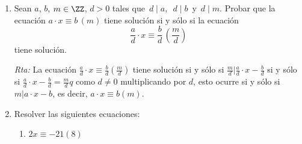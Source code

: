 \documentclass[12pt,spanish,makeidx]{amsbook}
\newcommand{\rta}{\noindent\textit{Rta: }}
\begin{document}
\begin{enumerate}
\begin{enumerate}
	\rta 	No tiene soluciones pues $0^2=0, 1^2=1, 2^2\equiv 1 (3)$.
		
		\item $ x^2  \equiv 0\quad (12)$
		
		\rta Soluciones menores que 12: $\{ 0, 6,\}$. Luego las soluciones son $\{12k, 12k+6\}$.
		
		\item $x^4  \equiv1\quad (16)$\quad
		
		\rta Notemos que $x$ debe ser impar. Podemos tomar $-8\le x\le 8$, es decir $x\in \{-7, -5,-3, -1, 1, 3, 5, 7\}$.
		Los cuadrados son $\{49, 25, 9, 1, 1,9, 25, 49\}$ que son congruentes módulo 16 a $\{1, 9, 9, 1, 1, 9, 9,1\}$
		A su vez cuando elevamos estos al cuadrado, como $9^2=81\equiv 1\quad(16)$ Tenemos que todo número impar es solución de la ecuación.
		
		Alternativamente podríamos elevar $2k+1$ a la cuarta con la f\'ormula binomial $\sum_{j=0}^4 \binom{4}{j}(2k)^j1^{4-j}=1+4\cdot 2k+6\cdot4k^2+4\cdot4k^3+16k^4= 1+8(k+3k^2)+16(k^3+k^4)\equiv 1+8(k+3k^2)\quad (16)$.
		Si observamos que $k(1+3k)$ siempre es par ya que es uno de los factores es par, tenemos que 
		$(2k+1)^4\equiv 1+ 16(3k+1)k/2\equiv 1\quad (16)$.
		
		\item $3x  \equiv 1 (5)$
		
		\rta Probamos con $x=0,1,2,3,4$ y vemos que $3\cdot2=6\equiv 1\quad (5)$. Luego las soluciones son $x=5k+2$.
	\end{enumerate}
	
	\item Sean $a$, $b$, $m \in {\ZZ}$, $d>0$ tales que  \,$d\mid a$,\,  \,$d\mid b$\, y \,$d\mid m$. Probar que la ecuación $a\cdot x \equiv b\,( m)$ tiene 	solución si y sólo si la ecuación
	\[ \frac{a}{d}\cdot x \equiv \frac{b}{d}\,\left(\frac{m}{d}\right)\]
	tiene solución.
		
	\rta La ecuación $\frac{a}{d}\cdot x \equiv \frac{b}{d} (\frac{m}{d})$
	tiene solución si y sólo si $\frac{m}{d}\vert \frac{a}{d}\cdot x - \frac{b}{d}$ si y sólo si $\frac{a}{d}\cdot x - \frac{b}{d}=\frac{m}{d}q$ como $d\neq0$ multiplicando por $d$, esto ocurre si y sólo si $m\vert a \cdot x - b $, es decir, $a \cdot x \equiv b (m)$.
	
	\smallskip
	
	\item Resolver las siguientes ecuaciones:
	\begin{enumerate}
		\item $2x \equiv -21 (8)$ 
		

\end{enumerate}
\end{enumerate}
\end{document}
